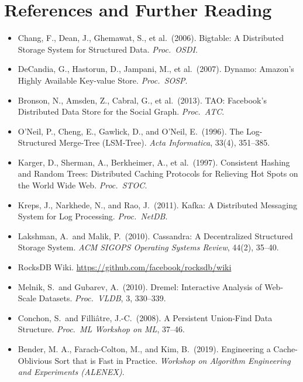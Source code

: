 \section{References and Further Reading}

\begin{itemize}
    \item Chang, F., Dean, J., Ghemawat, S., et al.\ (2006).  Bigtable: A
    Distributed Storage System for Structured Data.  \emph{Proc.\ OSDI}.

    \item DeCandia, G., Hastorun, D., Jampani, M., et al.\ (2007).  Dynamo:
    Amazon's Highly Available Key-value Store.  \emph{Proc.\ SOSP}.

    \item Bronson, N., Amsden, Z., Cabral, G., et al.\ (2013).  TAO:
    Facebook's Distributed Data Store for the Social Graph.  \emph{Proc.\ ATC}.

    \item O'Neil, P., Cheng, E., Gawlick, D., and O'Neil, E.\ (1996).
    The Log-Structured Merge-Tree (LSM-Tree).  \emph{Acta Informatica}, 33(4),
    351--385.

    \item Karger, D., Sherman, A., Berkheimer, A., et al.\ (1997).  Consistent
    Hashing and Random Trees: Distributed Caching Protocols for Relieving Hot
    Spots on the World Wide Web.  \emph{Proc.\ STOC}.

    \item Kreps, J., Narkhede, N., and Rao, J.\ (2011).  Kafka: A Distributed
    Messaging System for Log Processing.  \emph{Proc.\ NetDB}.

    \item Lakshman, A.\ and Malik, P.\ (2010).  Cassandra: A Decentralized
    Structured Storage System.  \emph{ACM SIGOPS Operating Systems Review}, 44(2),
    35--40.

    \item RocksDB Wiki.  \url{https://github.com/facebook/rocksdb/wiki}

    \item Melnik, S.\ and Gubarev, A.\ (2010).  Dremel: Interactive Analysis of
    Web-Scale Datasets.  \emph{Proc.\ VLDB}, 3, 330--339.

    \item Conchon, S.\ and Filliâtre, J.-C.\ (2008).  A Persistent
    Union-Find Data Structure.  \emph{Proc.\ ML Workshop on ML}, 37--46.

    \item Bender, M. A., Farach-Colton, M., and Kim, B.\ (2019).  Engineering
    a Cache-Oblivious Sort that is Fast in Practice.  \emph{Workshop on Algorithm
    Engineering and Experiments (ALENEX)}.


\end{itemize}

